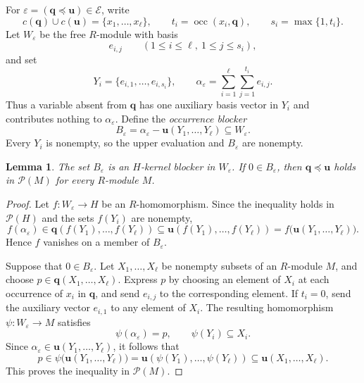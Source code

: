 \documentclass[10pt,a4paper]{amsart}
\newtheorem{lemma}[theorem]{Lemma}
\numberwithin{equation}{section}
\newcommand{\Pow}{\mathcal{P}}
\newcommand{\occ}{\operatorname{occ}}
\newcommand{\bu}{\mathbf{u}}
\newcommand{\bq}{\mathbf{q}}
\newcommand{\calE}{\mathcal{E}}
\renewcommand{\leq}{\leqslant}
\begin{document}
For $\varepsilon=(\bq\preceq\bu)\in\calE$, write
\[
 c(\bq)\cup c(\bu)=\{x_1,\ldots,x_\ell\},\qquad
 t_i=\occ(x_i,\bq),\qquad s_i=\max\{1,t_i\}.
\]
Let $W_\varepsilon$ be the free $R$-module with basis
\[
 e_{i,j}\qquad(1\leq i\leq\ell,\ 1\leq j\leq s_i),
\]
and set
\begin{equation}\label{eq:occurrence}
 Y_i=\{e_{i,1},\ldots,e_{i,s_i}\},\qquad
 \alpha_\varepsilon=\sum_{i=1}^{\ell}\sum_{j=1}^{t_i}e_{i,j}.
\end{equation}
Thus a variable absent from $\bq$ has one auxiliary basis vector in $Y_i$ and contributes nothing to $\alpha_\varepsilon$. Define the \emph{occurrence blocker}
\begin{equation}\label{eq:blocker}
 B_\varepsilon=\alpha_\varepsilon-\bu(Y_1,\ldots,Y_\ell)
 \subseteq W_\varepsilon.
\end{equation}
Every $Y_i$ is nonempty, so the upper evaluation and $B_\varepsilon$ are nonempty.

\begin{lemma}\label{lem:occurrence}
The set $B_\varepsilon$ is an $H$-kernel blocker in $W_\varepsilon$. If $0\in B_\varepsilon$, then $\bq\preceq\bu$ holds in $\Pow(M)$ for every $R$-module $M$.
\end{lemma}
\begin{proof}
Let $f:W_\varepsilon\to H$ be an $R$-homomorphism. Since the inequality holds in $\Pow(H)$ and the sets $f(Y_i)$ are nonempty,
\[
 f(\alpha_\varepsilon)
 \in\bq(f(Y_1),\ldots,f(Y_\ell))
 \subseteq\bu(f(Y_1),\ldots,f(Y_\ell))
 =f\bigl(\bu(Y_1,\ldots,Y_\ell)\bigr).
\]
Hence $f$ vanishes on a member of $B_\varepsilon$.

Suppose that $0\in B_\varepsilon$. Let $X_1,\ldots,X_\ell$ be nonempty subsets of an $R$-module $M$, and choose $p\in\bq(X_1,\ldots,X_\ell)$. Express $p$ by choosing an element of $X_i$ at each occurrence of $x_i$ in $\bq$, and send $e_{i,j}$ to the corresponding element. If $t_i=0$, send the auxiliary vector $e_{i,1}$ to any element of $X_i$. The resulting homomorphism $\psi:W_\varepsilon\to M$ satisfies
\begin{equation}\label{eq:occurrencemap}
 \psi(\alpha_\varepsilon)=p,\qquad \psi(Y_i)\subseteq X_i.
\end{equation}
Since $\alpha_\varepsilon\in\bu(Y_1,\ldots,Y_\ell)$, it follows that
\[
 p\in\psi\bigl(\bu(Y_1,\ldots,Y_\ell)\bigr)
 =\bu(\psi(Y_1),\ldots,\psi(Y_\ell))
 \subseteq\bu(X_1,\ldots,X_\ell).
\]
This proves the inequality in $\Pow(M)$.
\end{proof}
\end{document}
